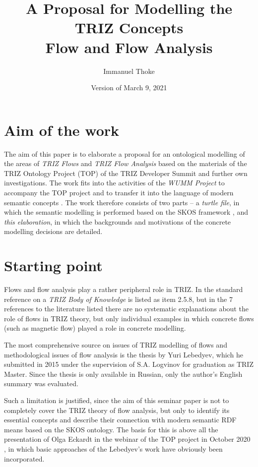 \documentclass[11pt,a4paper]{article}
\title{A Proposal for Modelling the TRIZ Concepts\\ Flow and Flow Analysis}
\author{Immanuel Thoke}
\date{Version of March 9, 2021}
\begin{document}
\maketitle

\section{Aim of the work}

The aim of this paper is to elaborate a proposal for an ontological modelling
of the areas of \emph{TRIZ Flows} and \emph{TRIZ Flow Analysis} based on the
materials of the TRIZ Ontology Project (TOP) of the TRIZ Developer Summit
\cite{TOP} and further own investigations. The work fits into the activities
of the \emph{WUMM Project} \cite{WUMM} to accompany the TOP project and to
transfer it into the language of modern semantic concepts
\cite{WUMM-Ontology}.  The work therefore consists of two parts -- a
\emph{turtle file}, in which the semantic modelling is performed based on the
SKOS framework \cite{SKOS}, and \emph{this elaboration}, in which the
backgrounds and motivations of the concrete modelling decisions are detailed.

\section{Starting point} 

Flows and flow analysis play a rather peripheral role in TRIZ.  In the
standard reference \cite{Petrov2007} on a \emph{TRIZ Body of Knowledge} is
listed as item 2.5.8, but in the 7 references to the literature listed there
are no systematic explanations about the role of flows in TRIZ theory, but
only individual examples in which concrete flows (such as magnetic flow)
played a role in concrete modelling.  

The most comprehensive source on issues of TRIZ modelling of flows and
methodological issues of flow analysis is the thesis \cite{Lebedyev2015} by
Yuri Lebedyev, which he submitted in 2015 under the supervision of S.A. 
Logvinov for graduation as TRIZ Master. Since the thesis is only available in
Russian, only the author's English summary was evaluated.

Such a limitation is justified, since the aim of this seminar paper is not to
completely cover the TRIZ theory of flow analysis, but only to identify its
essential concepts and describe their connection with modern semantic RDF
means based on the SKOS ontology. The basis for this is above all the
presentation of Olga Eckardt in the webinar of the TOP project in October 2020
\cite{Eckardt2020}, in which basic approaches of the Lebedyev's work have
obviously been incorporated.
\end{document}
